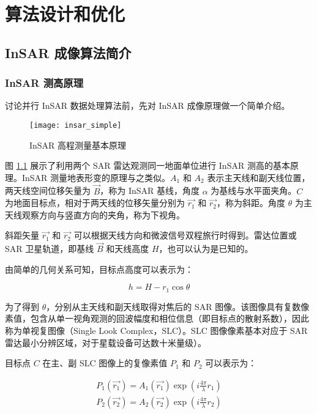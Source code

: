 \chapter{算法设计和优化}

\section{InSAR 成像算法简介}

\subsection{InSAR 测高原理}

讨论并行 InSAR 数据处理算法前，先对 InSAR 成像原理做一个简单介绍。\cite{simons2007interferometric} \cite{ferretti2007insar}

\begin{figure}[ht]
\centering
\texttt{[image: insar\_simple]}
\caption{InSAR 高程测量基本原理} \label{fig:insar_simple}
\end{figure}

图 \ref{fig:insar_simple} 展示了利用两个 SAR 雷达观测同一地面单位进行 InSAR 测高的基本原理。InSAR 测量地表形变的原理与之类似。$A_1$ 和 $A_2$ 表示主天线和副天线位置，两天线空间位移矢量为 $\vec{B}$，称为 InSAR 基线，角度 $\alpha$ 为基线与水平面夹角。$C$ 为地面目标点，相对于两天线的位移矢量分别为 $\vec{r_1}$ 和 $\vec{r_2}$，称为斜距。角度 $\theta$ 为主天线观察方向与竖直方向的夹角，称为下视角。

斜距矢量 $ \vec{r_1} $ 和 $ \vec{r_2} $ 可以根据天线方向和微波信号双程旅行时得到。雷达位置或 SAR 卫星轨道，即基线 $\vec{B}$ 和天线高度 $H$，也可以认为是已知的。

由简单的几何关系可知，目标点高度可以表示为：

\begin{equation}
    h = H - r_1 \cos\theta
\end{equation}

为了得到 $\theta$，分别从主天线和副天线取得对焦后的 SAR 图像。该图像具有复数像素值，包含从单一视角观测的回波幅度和相位信息（即目标点的散射系数），因此称为单视复图像（Single Look Complex，SLC）。SLC 图像像素基本对应于 SAR 雷达最小分辨区域，对于星载设备可达数十米量级\cite{sandwell2011gmtsar}）。

目标点 $C$ 在主、副 SLC 图像上的复像素值 $P_1$ 和 $P_2$ 可以表示为：

\begin{equation}
\begin{split}
    P_1(\vec{r_1}) = A_1(\vec{r_1}) \exp(i \frac{4\pi}{\lambda} r_1) \\
    P_2(\vec{r_2}) = A_2(\vec{r_2}) \exp(i \frac{4\pi}{\lambda} r_2) \\
\end{split}
\end{equation}

